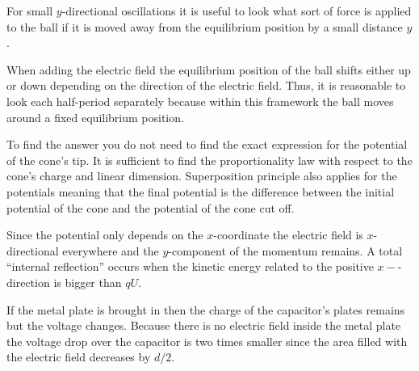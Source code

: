 \documentclass[11pt]{article}
\begin{document}

\hinteng
For small $y$-directional oscillations it is useful to look what sort of force is applied to the ball if it is moved away from the equilibrium position by a small distance $y$.
\probend
\bigskip


\hinteng
When adding the electric field the equilibrium position of the ball shifts either up or down depending on the direction of the electric field. Thus, it is reasonable to look each half-period separately because within this framework the ball moves around a fixed equilibrium position.
\probend
\bigskip


\hinteng
To find the answer you do not need to find the exact expression for the potential of the cone's tip. It is sufficient to find the proportionality law with respect to the cone's charge and linear dimension. Superposition principle also applies for the potentials meaning that the final potential is the difference between the initial potential of the cone and the potential of the cone cut off.
\probend
\bigskip


\hinteng
Since the potential only depends on the $x$-coordinate the electric field is $x$-directional everywhere and the $y$-component of the momentum remains. A total “internal reflection” occurs when the kinetic energy related to the positive $x-$-direction is bigger than $qU$.
\probend
\bigskip


\hinteng
If the metal plate is brought in then the charge of the capacitor's plates remains but the voltage changes. Because there is no electric field inside the metal plate the voltage drop over the capacitor is two times smaller since the area filled with the electric field decreases by $d/2$.
\probend
\bigskip
\end{document}
